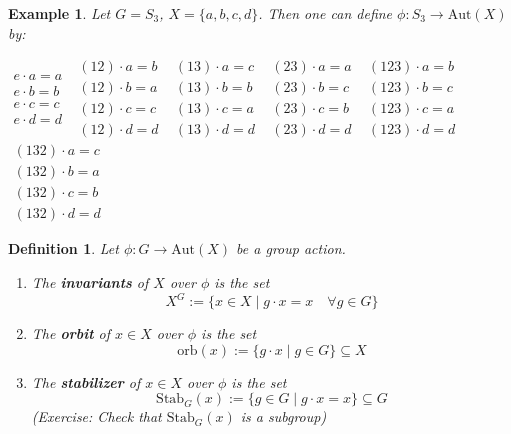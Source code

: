 \documentclass[11pt]{book}
\newtheorem{definition}[theorem]{Definition}
\newtheorem{example}[theorem]{Example}
\begin{document}
\begin{example}
Let $G = S_3$, $X = \{a,b,c,d\}$. Then one can define $\phi: S_3 \to \mathrm{Aut}(X)$ by:
\begin{center}
$\begin{matrix} e \cdot a = a\\
e \cdot b = b\\
e \cdot c = c\\
e \cdot d = d \end{matrix}$ \quad \quad  $\begin{matrix} (12) \cdot a = b\\
(12) \cdot b = a\\
(12) \cdot c = c\\
(12) \cdot d = d \end{matrix}$  \quad \quad  $\begin{matrix} (13) \cdot a = c\\
(13) \cdot b = b\\
(13) \cdot c = a\\
(13) \cdot d = d \end{matrix}$  \quad \quad $\begin{matrix} (23) \cdot a = a\\
(23) \cdot b = c\\
(23) \cdot c = b\\
(23) \cdot d = d \end{matrix}$ \quad \quad  $\begin{matrix} (123) \cdot a = b\\
(123) \cdot b = c\\
(123) \cdot c = a\\
(123) \cdot d = d \end{matrix}$  \quad \quad  $\begin{matrix} (132) \cdot a = c\\
(132) \cdot b = a\\
(132) \cdot c = b\\
(132) \cdot d = d \end{matrix}$  
\end{center}

\end{example}

\begin{definition} Let $\phi : G \to \mathrm{Aut}(X)$ be a group action.
\begin{enumerate}
    \item The \textbf{invariants} of $X$ over $\phi$ is the set
    \[
    X^G := \{x \in X \mid g \cdot x = x \quad \forall g \in G\}
    \]
    \item The \textbf{orbit} of $x \in X$ over $\phi$ is the set
    \[
    \mathrm{orb}(x) := \{g \cdot x \mid g \in G\} \subseteq X
    \]
    \item The \textbf{stabilizer} of $x \in X$ over $\phi$ is the set
    \[
    \mathrm{Stab}_G(x) := \{g \in G \mid g \cdot x = x\} \subseteq G
    \]
    (Exercise: Check that $\mathrm{Stab}_G(x)$ is a subgroup)
\end{enumerate}
\end{definition}
\end{document}
